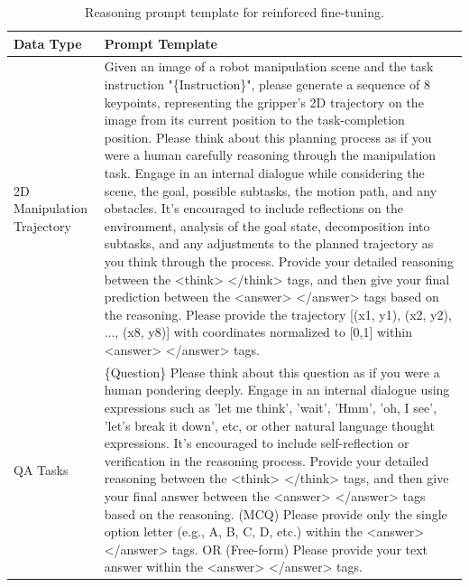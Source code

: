 \begin{table}[ht]
    \centering
    \caption{Reasoning prompt template for reinforced fine-tuning.}\label{tab:prompt_template}
    \begin{tabular}{|p{2.5cm}|p{10cm}|}
        \hline
        \textbf{Data Type} & \textbf{Prompt Template} \\
        \hline
        2D Manipulation Trajectory & 
        Given an image of a robot manipulation scene and the task instruction "\{Instruction\}", please generate a sequence of 8 keypoints, representing the gripper's 2D trajectory on the image from its current position to the task-completion position. Please think about this planning process as if you were a human carefully reasoning through the manipulation task. Engage in an internal dialogue while considering the scene, the goal, possible subtasks, the motion path, and any obstacles. It's encouraged to include reflections on the environment, analysis of the goal state, decomposition into subtasks, and any adjustments to the planned trajectory as you think through the process. Provide your detailed reasoning between the <think> </think> tags, and then give your final prediction between the <answer> </answer> tags based on the reasoning. \newline
        Please provide the trajectory [(x1, y1), (x2, y2), ..., (x8, y8)] with coordinates normalized to [0,1] within <answer> </answer> tags.\\
        \hline
        QA Tasks & 
        \{Question\} Please think about this question as if you were a human pondering deeply. Engage in an internal dialogue using expressions such as 'let me think', 'wait', 'Hmm', 'oh, I see', 'let's break it down', etc, or other natural language thought expressions. It's encouraged to include self-reflection or verification in the reasoning process. Provide your detailed reasoning between the <think> </think> tags, and then give your final answer between the <answer> </answer> tags based on the reasoning. \newline
        (MCQ) Please provide only the single option letter (e.g., A, B, C, D, etc.) within the <answer> </answer> tags. \newline
        OR \newline
        (Free-form) Please provide your text answer within the <answer> </answer> tags.
         \\
        \hline
    \end{tabular}
\end{table}



